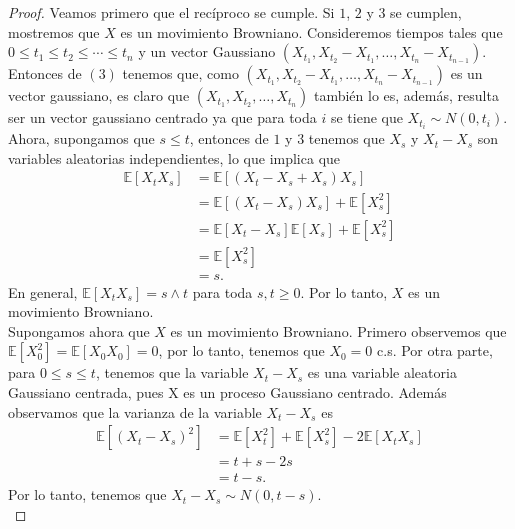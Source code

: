 \begin{proof}
Veamos primero que el recíproco se cumple. Si $1$, $2$ y $3$ se cumplen, mostremos que $X$ es un movimiento Browniano. Consideremos tiempos tales que $0 \leq t_1 \leq t_2 \leq \cdots \leq t_n$ y un vector Gaussiano $(X_{t_1}, X_{t_2} - X_{t_1}, \ldots, X_{t_n} - X_{t_{n-1}})$. \\

Entonces de $(3)$ tenemos que, como $(X_{t_1}, X_{t_2} - X_{t_1}, \ldots, X_{t_n} - X_{t_{n-1}})$ es un vector gaussiano, es claro que $(X_{t_1}, X_{t_2}, \ldots, X_{t_n})$ también lo es, además, resulta ser un vector gaussiano centrado ya que para toda $i$ se tiene que $X_{t_i} \sim N(0, t_i)$. \\

Ahora, supongamos que $s \leq t$, entonces de $1$ y $3$ tenemos que $X_s$ y $X_t - X_s$ son variables aleatorias independientes, lo que implica que
  \begin{align*}
  	\mathbb{E}[X_t X_s] &= \mathbb{E}[(X_t - X_s + X_s) X_s] \\
    &= \mathbb{E}[(X_t - X_s) X_s] + \mathbb{E}[X_s^2] \\
    &= \mathbb{E}[X_t - X_s] \mathbb{E}[X_s] + \mathbb{E}[X_s^2] \\
    &= \mathbb{E}[X_s^2] \\
    & = s.
  \end{align*}
En general, $\mathbb{E}[X_t X_s] = s \wedge t$ para toda $s, t \geq 0$. Por lo tanto, $X$ es un movimiento Browniano. \\

Supongamos ahora que $X$ es un movimiento Browniano. Primero observemos que $\mathbb{E} [X_0^2] = \mathbb{E} [X_0 X_0] = 0$, por lo tanto, tenemos que $X_0 = 0$ c.s. Por otra parte, para $0 \leq s \leq t$, tenemos que la variable $X_t - X_s$ es una variable aleatoria Gaussiano centrada, pues X es un proceso Gaussiano centrado. Además observamos que la varianza de la variable $X_t - X_s$ es
  \begin{align*}
  	\mathbb{E} [(X_t - X_s)^2] &= \mathbb{E} [X_t^2] + \mathbb{E} [X_s^2] - 2 \mathbb{E} [X_t X_s] \\
    & = t + s - 2 s \\
    &= t - s.
  \end{align*}
Por lo tanto, tenemos que $X_t - X_s \sim N(0, t - s)$. \\


\end{proof}
